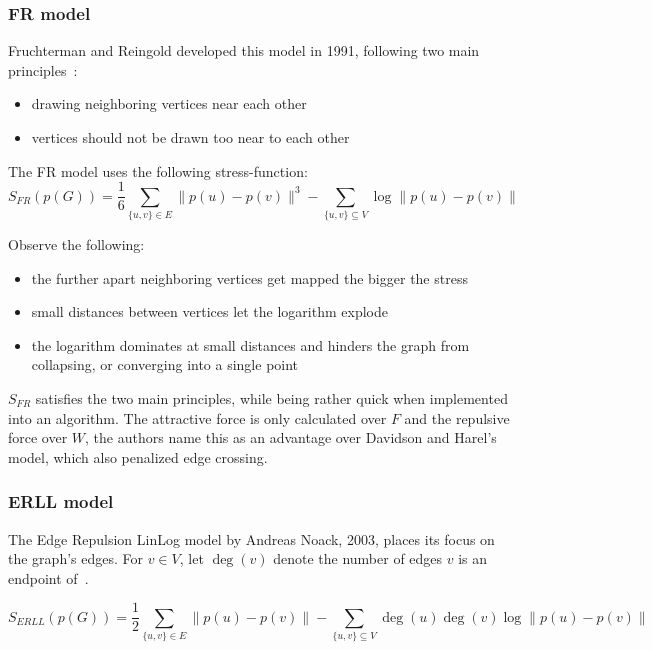 \documentclass[12pt]{article}
\begin{document}
\subsubsection{FR model}

Fruchterman and Reingold developed this model in 1991, following two main principles~\cite{fr_paper}:
\begin{itemize}
\item drawing neighboring vertices near each other
\item vertices should not  be drawn too near to each other
\end{itemize}

The FR model uses the following stress-function:
\begin{equation}
    S_{FR}(p(G)) = \frac{1}{6}\sum_{\{u,v\} \in E}{\parallel p(u)-p(v) \parallel^3}
    -
    \sum_{\{u,v \} \subseteq V}{\log \parallel p(u)-p(v) \parallel}
\end{equation}

Observe the following:

\begin{itemize}
\item the further apart neighboring vertices get mapped the bigger the stress
\item small distances between vertices let the logarithm explode
\item the logarithm dominates at small distances and hinders the graph from collapsing, or converging into a single point
\end{itemize}

$S_{FR}$ satisfies the two main principles, while being rather quick when implemented into an algorithm.
The attractive force is only calculated over $F$ and the repulsive force over $W$,
the authors name this as an advantage over Davidson and Harel's model, which also penalized edge crossing.

\subsubsection{ERLL model}

The Edge Repulsion LinLog model by Andreas Noack, 2003, places its focus on the graph's edges.
For $v \in V$, let $\deg(v)$ denote the number of edges $v$ is an endpoint of~\cite{erll_paper}.

\begin{equation}
    S_{ERLL}(p(G)) = \frac{1}{2} \sum_{\{u,v\} \in E}{\parallel p(u)-p(v) \parallel}
    -
    \sum_{\{u,v \} \subseteq V}{\deg(u)\deg(v) \log\parallel p(u)-p(v) \parallel}
\end{equation}
\end{document}
